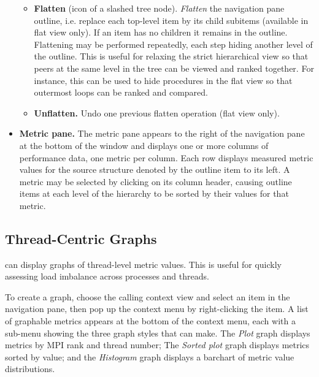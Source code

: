 \documentclass[english]{article}
\begin{document}
\begin{itemize}
\begin{itemize}
\item \textbf{Flatten} (icon of a slashed tree node).
\emph{Flatten} the navigation pane outline,
i.e. replace each top-level item by its child subitems
(available in flat view only).
If an item has no children it remains in the outline.
Flattening may be performed repeatedly, each step hiding another level of the outline.
This is useful for relaxing the strict hierarchical view
so that peers at the same level in the tree can be viewed and ranked together.
For instance, this can be used to hide procedures in the flat view
so that outermost loops can be ranked and compared.

\item \textbf{Unflatten.} Undo one previous flatten operation (flat view only).

\end{itemize}

\item  \textbf{Metric pane.}
The metric pane appears to the right of the navigation pane at the bottom of the window
and displays one or more columns of performance data, one metric per column.
Each row displays measured metric values for the source structure denoted by the outline item to its left.
A metric may be selected by clicking on its column header,
causing outline items at each level of the hierarchy to be sorted by their values for that metric.

\end{itemize}


\subsection{Thread-Centric Graphs}

 can display graphs of thread-level metric values.
This is useful for quickly assessing load imbalance across processes and threads.

To create a graph,
choose the calling context view and select an item in the navigation pane,
then pop up the context menu by right-clicking the item.
A list of graphable metrics appears at the bottom of the context menu,
each with a sub-menu showing the three graph styles that  can make.
The \emph{Plot} graph displays metrics by MPI rank and thread number;
The \emph{Sorted plot} graph displays metrics sorted by value;
and the \emph{Histogram} graph displays a barchart of metric value distributions.




\end{document}

